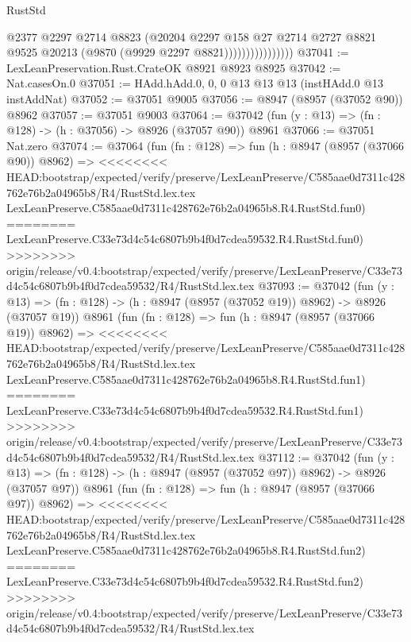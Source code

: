 \begin{lexlean}{RustStd}
\begin{coremodule}
{\begin{coremodule}
{{{{{{{{{{{{{{{{{{{{{{{{{{{{{{{{{{{{{{{                              @2377
                              @2297
                              @2714
                              @8823
                              (@20204
                                @2297
                                @158
                                @27
                                @2714
                                @2727
                                @8821
                                @9525
                                @20213
                                (@9870 (@9929 @2297 @8821))))))))))))))))
@37041 := LexLeanPreservation.Rust.CrateOK @8921 @8923 @8925
@37042 := Nat.casesOn.{0}
@37051 := HAdd.hAdd.{0, 0, 0} @13 @13 @13 (instHAdd.{0} @13 instAddNat)
@37052 := @37051 @9005
@37056 := @8947 (@8957 (@37052 @90)) @8962
@37057 := @37051 @9003
@37064 := @37042 (fun (y : @13) => (fn : @128) -> (h : @37056) -> @8926 (@37057 @90)) @8961
@37066 := @37051 Nat.zero
@37074 := @37064
    (fun (fn : @128) =>
    fun (h : @8947 (@8957 (@37066 @90)) @8962) =>
<<<<<<<< HEAD:bootstrap/expected/verify/preserve/LexLeanPreserve/C585aae0d7311c428762e76b2a04965b8/R4/RustStd.lex.tex
    LexLeanPreserve.C585aae0d7311c428762e76b2a04965b8.R4.RustStd.fun0)
========
    LexLeanPreserve.C33e73d4c54c6807b9b4f0d7cdea59532.R4.RustStd.fun0)
>>>>>>>> origin/release/v0.4:bootstrap/expected/verify/preserve/LexLeanPreserve/C33e73d4c54c6807b9b4f0d7cdea59532/R4/RustStd.lex.tex
@37093 := @37042
    (fun (y : @13) => (fn : @128) -> (h : @8947 (@8957 (@37052 @19)) @8962) -> @8926 (@37057 @19))
    @8961
    (fun (fn : @128) =>
    fun (h : @8947 (@8957 (@37066 @19)) @8962) =>
<<<<<<<< HEAD:bootstrap/expected/verify/preserve/LexLeanPreserve/C585aae0d7311c428762e76b2a04965b8/R4/RustStd.lex.tex
    LexLeanPreserve.C585aae0d7311c428762e76b2a04965b8.R4.RustStd.fun1)
========
    LexLeanPreserve.C33e73d4c54c6807b9b4f0d7cdea59532.R4.RustStd.fun1)
>>>>>>>> origin/release/v0.4:bootstrap/expected/verify/preserve/LexLeanPreserve/C33e73d4c54c6807b9b4f0d7cdea59532/R4/RustStd.lex.tex
@37112 := @37042
    (fun (y : @13) => (fn : @128) -> (h : @8947 (@8957 (@37052 @97)) @8962) -> @8926 (@37057 @97))
    @8961
    (fun (fn : @128) =>
    fun (h : @8947 (@8957 (@37066 @97)) @8962) =>
<<<<<<<< HEAD:bootstrap/expected/verify/preserve/LexLeanPreserve/C585aae0d7311c428762e76b2a04965b8/R4/RustStd.lex.tex
    LexLeanPreserve.C585aae0d7311c428762e76b2a04965b8.R4.RustStd.fun2)
========
    LexLeanPreserve.C33e73d4c54c6807b9b4f0d7cdea59532.R4.RustStd.fun2)
>>>>>>>> origin/release/v0.4:bootstrap/expected/verify/preserve/LexLeanPreserve/C33e73d4c54c6807b9b4f0d7cdea59532/R4/RustStd.lex.tex
}}}}}}}}}}}}}}}}}}}}}}}}}}}}}}}}}}}}}}}
\end{coremodule}}
\end{coremodule}
\end{lexlean}

